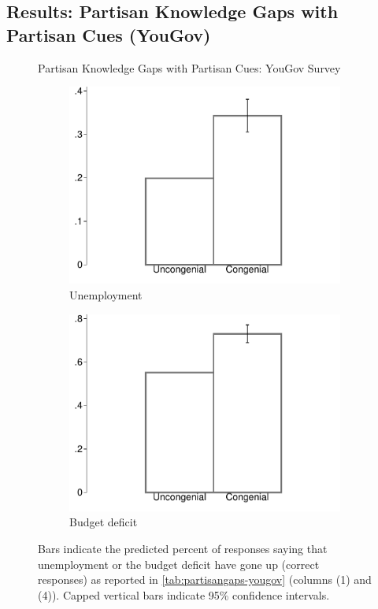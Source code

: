 \documentclass[12pt, letterpaper]{article}
\begin{document}
\subsection*{Results: Partisan Knowledge Gaps with Partisan Cues (YouGov)}
\begin{figure}[t]
	\caption{Partisan Knowledge Gaps with Partisan Cues: YouGov Survey}	
	\centering
	\begin{subfigure}{.495\textwidth}\centering
		\includegraphics[width=\textwidth]{../figs/yougov-unemp-congenialcue.pdf}
		\caption{Unemployment}
	\end{subfigure}
	\hfil
	\begin{subfigure}{.495\textwidth}\centering
		\includegraphics[width=\textwidth]{../figs/yougov-deficit-congenialcue.pdf}
		\caption{Budget deficit}
	\end{subfigure}	
	\caption*{\footnotesize Bars indicate the predicted percent of responses saying that unemployment or the budget deficit have gone up (correct responses) as reported in \cref{tab:partisangaps-yougov} (columns (1) and (4)).  
		Capped vertical bars indicate 95\% confidence intervals.
	}
	\label{fig:yougov-reg}
\end{figure}
\end{document}
